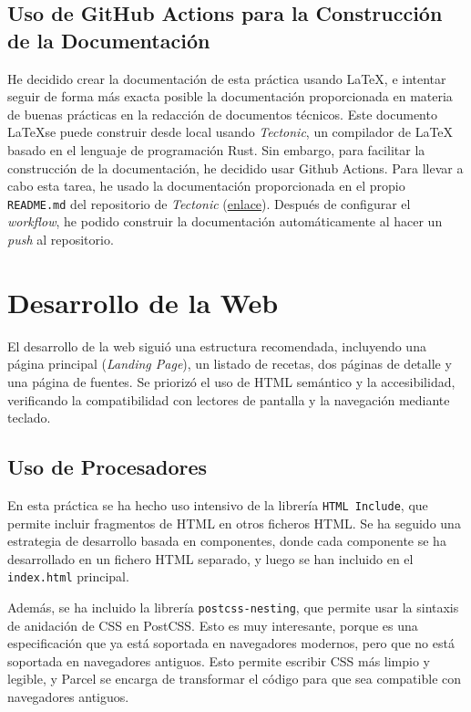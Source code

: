 \documentclass{article}
\begin{document}
\subsection{Uso de GitHub Actions para la Construcción de la Documentación}\label{subsec:uso-de-github-actions-para-la-construccion-de-la-documentacion}

He decidido crear la documentación de esta práctica usando \LaTeX, e intentar seguir de forma más exacta posible la documentación proporcionada en materia de buenas prácticas en la redacción de documentos técnicos. Este documento \LaTeX se puede construir desde local usando \textit{Tectonic}, un compilador de LaTeX basado en el lenguaje de programación Rust. Sin embargo, para facilitar la construcción de la documentación, he decidido usar Github Actions. Para llevar a cabo esta tarea, he usado la documentación proporcionada en el propio \texttt{README.md} del repositorio de \textit{Tectonic} (\href{https://github.com/marketplace/actions/setup-tectonic}{enlace}). Después de configurar el \textit{workflow}, he podido construir la documentación automáticamente al hacer un \textit{push} al repositorio.

\section{Desarrollo de la Web}\label{sec:desarrollo-de-la-web}

El desarrollo de la web siguió una estructura recomendada, incluyendo una página principal (\textit{Landing Page}), un listado de recetas, dos páginas de detalle y una página de fuentes. Se priorizó el uso de HTML semántico y la accesibilidad, verificando la compatibilidad con lectores de pantalla y la navegación mediante teclado.

\subsection{Uso de Procesadores}\label{subsec:uso-de-procesadores}

En esta práctica se ha hecho uso intensivo de la librería \texttt{HTML Include}, que permite incluir fragmentos de HTML en otros ficheros HTML. Se ha seguido una estrategia de desarrollo basada en componentes, donde cada componente se ha desarrollado en un fichero HTML separado, y luego se han incluido en el \texttt{index.html} principal.

Además, se ha incluido la librería \texttt{postcss-nesting}, que permite usar la sintaxis de anidación de CSS en PostCSS. Esto es muy interesante, porque es una especificación que ya está soportada en navegadores modernos, pero que no está soportada en navegadores antiguos. Esto permite escribir CSS más limpio y legible, y Parcel se encarga de transformar el código para que sea compatible con navegadores antiguos.
\end{document}
